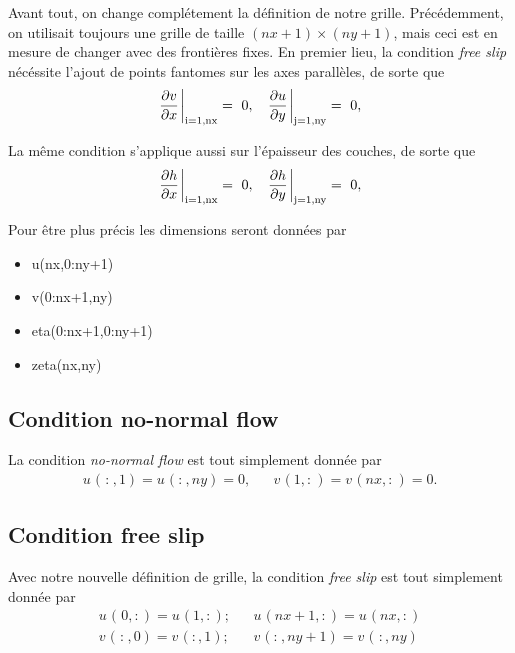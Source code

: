 \documentclass[10pt]{article}
\numberwithin{equation}{section}
\newcommand{\pt}{\hspace{1pt}} %
\begin{document}
Avant tout, on change complétement la définition de notre grille.
Précédemment, on utilisait toujours une grille de taille \((nx+1)\times(ny+1)\), mais ceci est en mesure de changer avec des frontières fixes.
En premier lieu, la condition \emph{free slip} nécéssite l'ajout de points fantomes sur les axes parallèles, de sorte que
\begin{align}
&&   \eval{\pdv{v}{x}\pt}_\text{i=1,nx} = \ 0, && \eval{\pdv{u}{y}\pt}_\text{j=1,ny} =\ 0, &&
\end{align}

La même condition s'applique aussi sur l'épaisseur des couches, de sorte que
\begin{align}
   &&   \eval{\pdv{h}{x}\pt}_\text{i=1,nx} = \ 0, && \eval{\pdv{h}{y}\pt}_\text{j=1,ny} =\ 0, &&
\end{align}

Pour être plus précis les dimensions seront données par
\begin{itemize}
\item u(nx,0:ny+1)
\item v(0:nx+1,ny)
\item eta(0:nx+1,0:ny+1)
\item zeta(nx,ny)
\end{itemize}
\subsection{Condition no-normal flow}
\label{sec:org9cf94ae}
La condition \emph{no-normal flow} est tout simplement donnée par
\begin{align}
   && u\pt(\pt:\pt,1) = u\pt(:\pt,ny) = 0, && v\pt(1,:\pt) = v\pt(nx,:\pt) = 0. &&
\end{align}
\subsection{Condition free slip}
\label{sec:orgc3cb011}
Avec notre nouvelle définition de grille, la condition \emph{free slip} est tout simplement donnée par
\begin{align}
    && u\pt(\pt0,:) = u\pt(1,:); && u\pt(nx+1,:) = u\pt(nx,:) && \\
    && v\pt(\pt:\pt,0) = v\pt(:,1); && v\pt(:\pt,ny+1) = v\pt(\pt:,ny) &&
\end{align}
\end{document}

